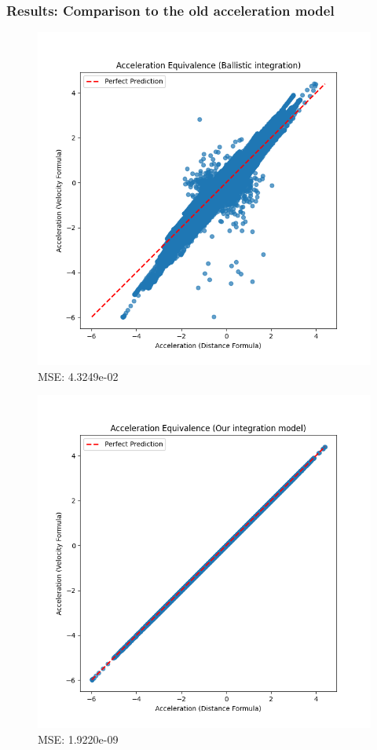 \begin{frame}
  \frametitle{Results: Comparison to the old acceleration model}
  \begin{figure}
    \centering
    \begin{minipage}[b]{0.49\linewidth}
        \includegraphics[width=\textwidth]{figures/graphs/Acceleration Equivalence (Ballistic integration).png}
        \centering \footnotesize MSE: 4.3249e-02
    \end{minipage}
    \begin{minipage}[b]{0.49\linewidth}
        \includegraphics[width=\textwidth]{figures/graphs/Acceleration Equivalence (Our integration model).png}
        \centering \footnotesize MSE: 1.9220e-09


\end{minipage}
\end{figure}
\end{frame}
